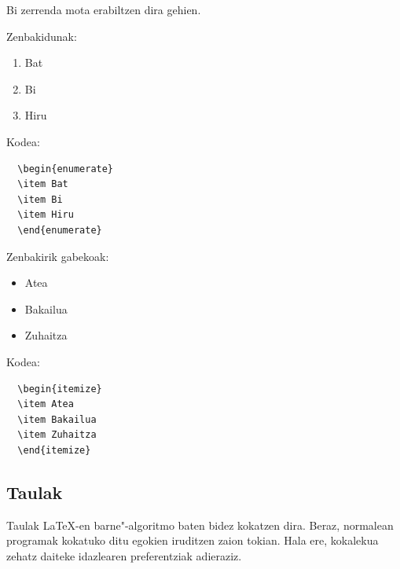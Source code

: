Bi zerrenda mota erabiltzen dira gehien.

Zenbakidunak:
\begin{enumerate}
\item Bat
\item Bi
\item Hiru
\end{enumerate}

Kodea:

\vspace{0.25 cm}

\begin{minipage}{8cm}
\begin{verbatim}
  \begin{enumerate} 
  \item Bat
  \item Bi
  \item Hiru
  \end{enumerate} 
\end{verbatim}
\end{minipage}

\vspace{0.5 cm}

Zenbakirik gabekoak:
\begin{itemize}
\item Atea
\item Bakailua
\item Zuhaitza
\end{itemize}

Kodea:
\vspace{0.5 cm}

\begin{minipage}{8cm}
\begin{verbatim}
  \begin{itemize}
  \item Atea
  \item Bakailua
  \item Zuhaitza
  \end{itemize}
\end{verbatim}
\end{minipage}

\subsection{Taulak}
\label{azpiatala:taulak}

Taulak  \LaTeX{}-en barne"-algoritmo baten bidez kokatzen dira. Beraz, normalean programak kokatuko ditu egokien iruditzen zaion tokian. Hala ere, kokalekua zehatz daiteke idazlearen preferentziak adieraziz.  


